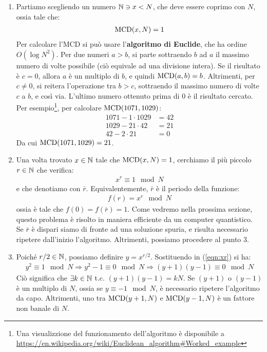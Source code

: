 \documentclass[../../InformazioneQuantistica.tex]{subfiles}
\begin{document}
\begin{enumerate}
    \item Partiamo scegliendo un numero $\mathbb{N} \ni x < N$, che deve essere coprimo con $N$, ossia tale che:
    \begin{align*}
        \operatorname{MCD}(x,N) = 1
    \end{align*}
    Per calcolare l'MCD si può usare l'\textbf{algoritmo di Euclide}, che ha ordine $O(\log N^2)$. Per due numeri $a>b$, si parte sottraendo $b$ ad $a$ il massimo numero di volte possibile (ciò equivale ad una divisione intera). Se il risultato è $c = 0$, allora $a$ è un multiplo di $b$, e quindi $\operatorname{MCD}(a,b) = b$. Altrimenti, per $c\neq 0$, si reitera l'operazione tra $b>c$, sottraendo il massimo numero di volte $c$ a $b$, e così via. L'ultimo numero ottenuto prima di $0$ è il risultato cercato.\\
    Per esempio\footnote{Una visualizzione del funzionamento dell'algoritmo è disponibile a \url{https://en.wikipedia.org/wiki/Euclidean_algorithm\#Worked_example}}, per calcolare $\operatorname{MCD}(1071,1029)$:
    \begin{align*}
        1071-1\cdot 1029 &= 42\\
        1029-21\cdot 42 &= 21\\
        42-2\cdot 21 &= 0
    \end{align*}
    Da cui $\operatorname{MCD}(1071,1029)=21$.
    \item Una volta trovato $x \in \mathbb{N}$ tale che $\operatorname{MCD}(x,N)=1$, cerchiamo il più piccolo $r \in \mathbb{N}$ che verifica:
    \begin{align}
        x^r \equiv 1 \mod N
        \label{eqn:xr}
    \end{align}
    e che denotiamo con $\bar{r}$. Equivalentemente, $\bar{r}$ è il periodo della funzione:
    \begin{align*}
        f(r) = x^r \mod N
    \end{align*}
    ossia è tale che $f(0) = f(\bar{r}) = 1$. Come vedremo nella prossima sezione, questo problema è risolto in maniera efficiente da un computer quantistico.\\
    Se $\bar{r}$ è dispari siamo di fronte ad una soluzione spuria, e risulta necessario ripetere dall'inizio l'algoritmo. Altrimenti, possiamo procedere al punto $3$.
    \item Poiché $r/2 \in \mathbb{N}$, possiamo definire $y=x^{r/2}$. Sostituendo in (\ref{eqn:xr}) si ha:
    \begin{align*}
        y^2 \equiv 1 \mod N \Rightarrow y^2 - 1 \equiv 0 \mod N \Rightarrow (y+1)(y-1) \equiv 0 \mod N
    \end{align*}
    Ciò significa che $\exists k \in \mathbb{N}$ t.c. $(y+1)(y-1)=kN$. Se $(y+1)$ o $(y-1)$ è un multiplo di $N$, ossia se $y \equiv -1 \mod N$, è necessario ripetere l'algoritmo da capo. Altrimenti, uno tra $\operatorname{MCD}(y+1,N)$ e $\operatorname{MCD}(y-1,N)$ è un fattore non banale di $N$.
\end{enumerate}
\end{document}
